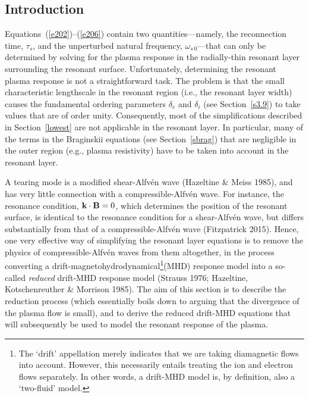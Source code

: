 \documentclass[notitlepage,12pt]{article}
\begin{document}
\subsection{Introduction}
Equations~(\ref{e202})--(\ref{e206}) contain two quantities---namely, the reconnection time, $\tau_s$, and the unperturbed
natural frequency, $\omega_{s\,0}$---that can only be determined by solving for the plasma response in the radially-thin resonant layer surrounding the resonant surface. Unfortunately, determining the resonant plasma response is not a straightforward task. The
problem is that the small characteristic lengthscale in the resonant region (i.e., the resonant layer width) causes the fundamental ordering parameters
$\delta_e$ and $\delta_i$ (see Section~\ref{s3.9}) to take values that are of order unity. Consequently, most of the simplifications described in
Section~\ref{lowest} are not applicable in the resonant layer. In particular, many of the terms in the Braginskii equations (see Section~\ref{sbrag}) that are negligible in the outer region (e.g., plasma resistivity) have to be taken into account in the resonant layer. 

A tearing mode is a modified shear-Alfv\'{e}n wave (Hazeltine \& Meiss 1985), and has very little connection with a compressible-Alfv\'{e}n wave. For instance, the resonance condition, ${\bf k}\cdot{\bf B}=0$, which determines the position of the resonant
surface, is identical to the resonance condition for a  shear-Alfv\'{e}n wave, but differs substantially from that of a  compressible-Alfv\'{e}n wave (Fitzpatrick 2015). Hence, one very effective way of simplifying the resonant layer equations is to remove the
physics of  compressible-Alfv\'{e}n waves from them altogether, in the process converting a 
drift-magnetohydrodynamical\footnote{The  `drift' appellation  merely indicates that we are taking diamagnetic flows into account. However, this necessarily entails treating the ion and electron flows separately. In other words, a
drift-MHD model is,  by definition, also a `two-fluid' model. }(MHD) response model  
into a so-called {\em reduced}\/ drift-MHD response model (Strauss 1976; Hazeltine, Kotschenreuther \& Morrison 1985). The aim of
this section is to describe the reduction process (which essentially boils down to arguing that the divergence of the
plasma flow is small), and to derive the reduced drift-MHD equations that will subsequently be used to model the resonant
response of the plasma. 
\end{document}
